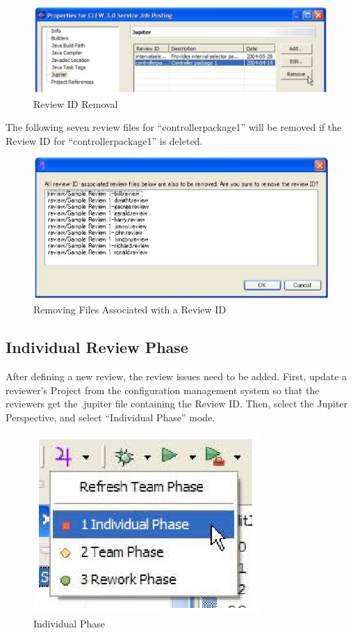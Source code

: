 \begin{figure}[htbp]
  \centering
  \includegraphics{images/fig3-12.eps}
  \caption{Review ID Removal}
  \label{fig3-12}
\end{figure}

The following seven review files for ``controllerpackage1'' will be removed if the Review ID for ``controllerpackage1'' is deleted.

\begin{figure}[htbp]
  \centering
  \includegraphics{images/fig3-13.eps}
  \caption{Removing Files Associated with a Review ID}
  \label{fig3-13}
\end{figure}

\subsection{Individual Review Phase}
\label{subsec:individual-review-phase}

After defining a new review, the review issues need to be added. First, update a reviewer's Project from the configuration management system so that the reviewers get the .jupiter file containing the Review ID.  Then, select the Jupiter Perspective, and select ``Individual Phase'' mode.

\begin{figure}[htbp]
  \centering
  \includegraphics{images/fig3-14.eps}
  \caption{Individual Phase}
  \label{fig3-14}
\end{figure}

